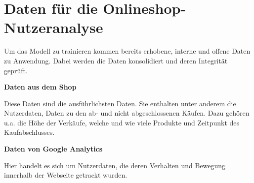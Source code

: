 


\section{Daten für die Onlineshop-Nutzeranalyse}
Um das Modell zu trainieren kommen bereits erhobene, interne und offene
Daten zu Anwendung. Dabei werden die Daten konsolidiert und deren Integrität geprüft.\vspace{0.2cm}

\textbf{Daten aus dem Shop}\vspace{0.1cm}

Diese Daten sind die ausführlichsten Daten. Sie enthalten unter anderem die Nutzerdaten, Daten zu den ab- und nicht abgeschlossenen Käufen. Dazu gehören u.a. die Höhe der Verkäufe, welche und wie viele Produkte und Zeitpunkt des Kaufabschlusses.\vspace{0.2cm}

\textbf{Daten von Google Analytics}\vspace{0.1cm}

Hier handelt es sich um Nutzerdaten, die deren Verhalten und Bewegung innerhalb der Webseite getrackt wurden.\vspace{0.2cm}

